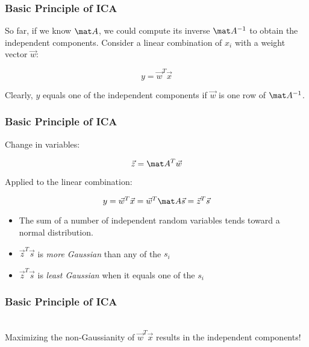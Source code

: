 \begin{frame}
  \frametitle{Basic Principle of ICA}

  So far, if we know $\mat A$, we could compute its inverse $\mat A^{-1}$ to obtain the independent components. Consider a linear combination of $x_i$ with a weight vector $\vec w$:
  
  \begin{displaymath}
    y = \vec w^T \vec x
  \end{displaymath}
  \spread

  Clearly, $y$ equals one of the independent components if $\vec w$ is one row of $\mat A^{-1}$.
\end{frame}


\begin{frame}
  \frametitle{Basic Principle of ICA \cont}

  Change in variables:

  \begin{displaymath}
    \vec z = \mat A^T \vec w
  \end{displaymath}
  
  Applied to the linear combination:

  \begin{displaymath}
    y = \vec w^T \vec x = \vec w^T \mat A \vec s = \vec z^T \vec s
  \end{displaymath}
  \pspread


  \begin{itemize}
    \item The sum of a number of independent random variables tends toward a normal distribution. \pause
    \item $\vec z^T \vec s$ is \textit{more Gaussian} than any of the $s_i$ \pause 
    \item $\vec z^T \vec s$ is \textit{least Gaussian} when it equals one of the $s_i$
  \end{itemize}
\end{frame}


\begin{frame}
  \frametitle{Basic Principle of ICA \cont}

   \\[.25cm]

  Maximizing the non-Gaussianity of $\vec w^T \vec x$ results in the independent components!
\end{frame}


